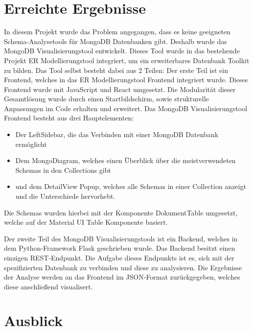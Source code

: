 \section{Erreichte Ergebnisse}
\label{sec:ergebnisse}

\iffalse
Die Zusammenfassung dient dazu, die wesentlichen Ergebnisse des 
Praktikums und vor allem die entwickelte Problemlösung und den 
erreichten Fortschritt darzustellen. (Sie haben Ihr Ziel erreicht und 
dies nachgewiesen).
\fi

In diesem Projekt wurde das Problem angegangen, dass es keine geeigneten Schema-Analysetools für MongoDB Datenbanken gibt.
Deshalb wurde das MongoDB Visualisierungstool entwickelt.
Dieses Tool wurde in das bestehende Projekt ER Modellierungstool integriert, um ein erweiterbares Datenbank Toolkit zu bilden.
Das Tool selbst besteht dabei aus 2 Teilen:
Der erste Teil ist ein Frontend, welches in das ER Modellierungstool Frontend integriert wurde.
Dieses Frontend wurde mit JavaScript und React umgesetzt.
Die Modularität dieser Gesamtlösung wurde durch einen Startbildschirm, sowie strukturelle Anpassungen im Code erhalten und erweitert.
Das MongoDB Visualisierungstool Frontend besteht aus drei Hauptelementen:
\begin{itemize}
    \item Der LeftSidebar, die das Verbinden mit einer MongoDB Datenbank ermöglicht
    \item Dem MongoDiagram, welches einen Überblick über die meistverwendeten Schemas in den Collections gibt
    \item und dem DetailView Popup, welches alle Schemas in einer Collection anzeigt und die Unterschiede hervorhebt.
\end{itemize}

Die Schemas wurden hierbei mit der Komponente DokumentTable umgesetzt, welche auf der Material UI Table Komponente basiert.

Der zweite Teil des MongoDB Visualisierungstools ist ein Backend, welches in dem Python-Framework Flask geschrieben wurde.
Das Backend besitzt einen einzigen REST-Endpunkt.
Die Aufgabe dieses Endpunkts ist es, sich mit der spezifizierten Datenbank zu verbinden und diese zu analysieren.
Die Ergebnisse der Analyse werden an das Frontend im JSON-Format zurückgegeben, welches diese anschließend visualisert.

\section{Ausblick}
\label{sec:ausblick}

